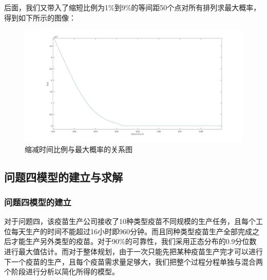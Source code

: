 \documentclass{ctexart}
\begin{document}
后面，我们又带入了缩短比例为1\%到9\%的等间距50个点对所有排列求最大概率，得到如下所示的图像：
\begin{figure}[H]
\centering
\includegraphics[width=0.8\linewidth]{A3图片/pprob.jpg}
\caption{缩减时间比例与最大概率的关系图}
\label{r-prob-ratio}
\end{figure}

\subsection{问题四模型的建立与求解}
\subsubsection{问题四模型的建立}
对于问题四，该疫苗生产公司接收了10种类型疫苗不同规模的生产任务，且每个工位每天生产的时间不能超过16小时即960分钟。而且同种类型疫苗生产全部完成之后才能生产另外类型的疫苗。对于90\%的可靠性，我们采用正态分布的0.9分位数进行最大值估计。而对于整体规划，由于一次只能先把某种疫苗生产完才可以进行下一个疫苗的生产，且每个疫苗需求量足够大，我们把整个过程分程单独与混合两个阶段进行分析以简化所得的模型。
\end{document}
